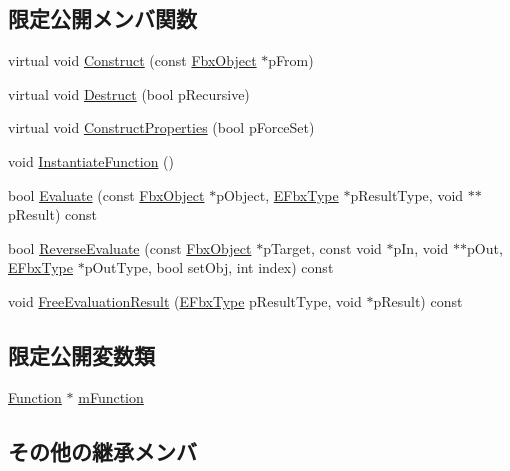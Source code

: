 \subsection*{限定公開メンバ関数}
\begin{DoxyCompactItemize}
\item 
virtual void \hyperlink{class_fbx_binding_operator_addee18722d7806245f10a1c873bafaac}{Construct} (const \hyperlink{class_fbx_object}{Fbx\+Object} $\ast$p\+From)
\item 
virtual void \hyperlink{class_fbx_binding_operator_a183d8593f526ca03661506ad1aedf412}{Destruct} (bool p\+Recursive)
\item 
virtual void \hyperlink{class_fbx_binding_operator_ab7e4a678475a62b3bf36b1171860c17e}{Construct\+Properties} (bool p\+Force\+Set)
\item 
void \hyperlink{class_fbx_binding_operator_aba1f55d1c5458713779fc2bdfc272b3e}{Instantiate\+Function} ()
\item 
bool \hyperlink{class_fbx_binding_operator_a46e67c6d662013ae83cd239648d85630}{Evaluate} (const \hyperlink{class_fbx_object}{Fbx\+Object} $\ast$p\+Object, \hyperlink{fbxpropertytypes_8h_a73913a5ddfb20e57c6f25e9e6784bd92}{E\+Fbx\+Type} $\ast$p\+Result\+Type, void $\ast$$\ast$p\+Result) const
\item 
bool \hyperlink{class_fbx_binding_operator_a7528f0c6f942433c0c5c78fc5e803bbc}{Reverse\+Evaluate} (const \hyperlink{class_fbx_object}{Fbx\+Object} $\ast$p\+Target, const void $\ast$p\+In, void $\ast$$\ast$p\+Out, \hyperlink{fbxpropertytypes_8h_a73913a5ddfb20e57c6f25e9e6784bd92}{E\+Fbx\+Type} $\ast$p\+Out\+Type, bool set\+Obj, int index) const
\item 
void \hyperlink{class_fbx_binding_operator_af7e8559f61c34efa27b1562d386efd2c}{Free\+Evaluation\+Result} (\hyperlink{fbxpropertytypes_8h_a73913a5ddfb20e57c6f25e9e6784bd92}{E\+Fbx\+Type} p\+Result\+Type, void $\ast$p\+Result) const
\end{DoxyCompactItemize}
\subsection*{限定公開変数類}
\begin{DoxyCompactItemize}
\item 
\hyperlink{class_fbx_binding_operator_1_1_function}{Function} $\ast$ \hyperlink{class_fbx_binding_operator_a677a0ed0b5782978a21c8a4b371821f5}{m\+Function}
\end{DoxyCompactItemize}
\subsection*{その他の継承メンバ}


